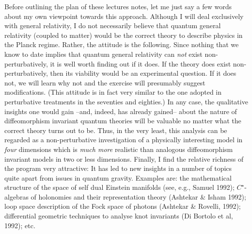 Before outlining the plan of these lectures notes, let me just say a few
words about my own viewpoint towards this approach. Although I will deal
exclusively with general relativity, I do not necessarily believe that
quantum general relativity (coupled to matter) would be the correct theory
to describe physics in the Planck regime. Rather, the attitude is the
following. Since nothing that we know to date implies that quantum general
relativity can {\it not} exist non-perturbatively, it is well worth
finding out if it does. If the theory does exist non-perturbatively, then
its viability would be an experimental question. If it does not, we will learn
why not and the exercise will presumably suggest modifications. (This
attitude is in fact very similar to the one adopted in perturbative
treatments in the seventies and eighties.) In any case, the qualitative
insights one would gain --and, indeed, has already gained--
about the nature of diffeomorphism invariant quantum theories will be
valuable no matter what the correct theory turns out to be. Thus, in the
very least, this analysis can be regarded as a non-perturbative investigation
of a physically interesting model in {\it four} dimensions which is {\it much
more} realistic than analogous diffeomorphism invariant models in two or
less dimensions. Finally, I find the relative richness of the program very
attractive: It has led to new insights in a number of topics quite apart
from issues in quantum gravity. Examples are: the mathematical structure of
the space of self dual Einstein manifolds (see, e.g., Samuel 1992);
$C^\star$-algebras of holonomies and their representation theory (Ashtekar
\& Isham 1992); loop space description of the Fock space of
photons (Ashtekar \& Rovelli, 1992); differential geometric techniques to
analyse knot invariants (Di Bortolo et al, 1992); etc.

